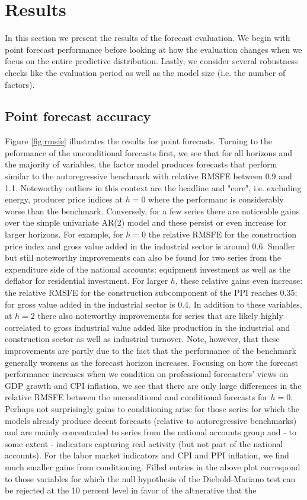 \documentclass[notitlepage,a4paper,12pt]{article}
\begin{document}
\section{Results}

In this section we present the results of the forecast evaluation. We begin with point forecast performance before looking at how the evaluation changes when we focus on the entire predictive distribution. Lastly, we consider several robustness checks like the evaluation period as well as the model size (i.e. the number of factors). 

\subsection{Point forecast accuracy}

Figure \ref{fig:rmsfe} illustrates the results for point forecasts. Turning to the peformance of the unconditional forecasts first, we see that for all horizons and the majority of variables, the factor model produces forecasts that perform similar to the autoregressive benchmark with relative RMSFE between 0.9 and 1.1. Noteworthy outliers in this context are the headline and "core", i.e. excluding energy, producer price indices at $h=0$ where the performanc is considerably worse than the benchmark. Conversely, for a few series there are noticeable gains over the simple univariate AR(2) model and these persist or even increase for larger horizons. For example, for $h=0$ the relative RMSFE for the construction price index and gross value added in the industrial sector is around 0.6. Smaller but still noteworthy improvements can also be found for two series from the expenditure side of the national accounts: equipment investment as well as the deflator for residential investment. For larger $h$, these relative gains even increase: the relative RMSFE for the construction subcomponent of the PPI reaches 0.35; for gross value added in the industrial sector is 0.4. In addition to these variables, at $h=2$ there also noteworthy improvements for series that are likely highly correlated to gross industrial value added like production in the industrial and construction sector as well as industrial turnover. Note, however, that these improvements are partly due to the fact that the performance of the benchmark generally worsens as the forecast horizon increases. Focusing on how the forecast performance increases when we condition on professional forecasters' views on GDP growth and CPI inflation, we see that there are only large differences in the relative RMSFE between the unconditional and conditional forecasts for $h=0$. Perhaps not surprisingly gains to conditioning arise for those series for which the models already produce decent forecasts (relative to autoregressive benchmarks) and are mainly concentrated to series from the national accounts group and - to some extent - indicators capturing real activity (but not part of the national accounts). For the labor market indicators and CPI and PPI inflation, we find much smaller gains from conditioning. Filled entries in the above plot correspond to those variables for which the null hypothesis of the Diebold-Mariano test can be rejected at the 10 percent level in favor of the altnerative that the 
\end{document}
